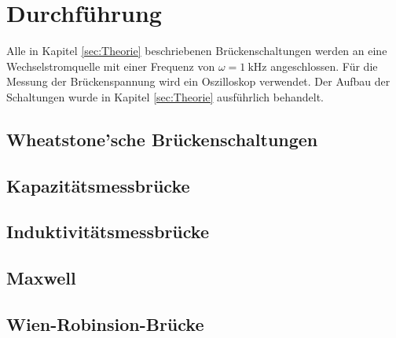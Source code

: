 \section{Durchführung}
\label{sec:Durchführung}
Alle in Kapitel \ref{sec:Theorie} beschriebenen Brückenschaltungen werden an eine Wechselstromquelle mit einer Frequenz von 
$\omega=\SI{1}{\kilo\hertz}$ angeschlossen. Für die Messung der Brückenspannung wird ein Oszilloskop verwendet. Der Aufbau der 
Schaltungen wurde in Kapitel \ref{sec:Theorie} ausführlich behandelt. 

\subsection{Wheatstone'sche Brückenschaltungen}
\label{sec:durch-wheatstone}
\subsection{Kapazitätsmessbrücke}
\label{sec:durch-Cbrücke}
\subsection{Induktivitätsmessbrücke}
\label{sec:durch-Lbrücke}
\subsection{Maxwell}
\label{sec:durch-maxwell}
\subsection{Wien-Robinsion-Brücke}
\label{sec:durch-wien-robinson}